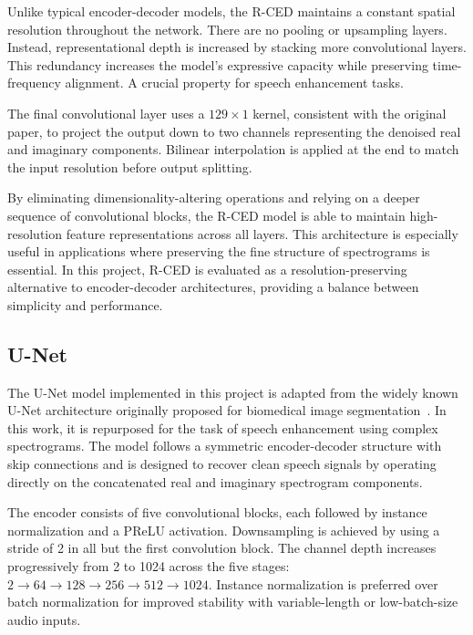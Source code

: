Unlike typical encoder-decoder models, the R-CED maintains a constant spatial resolution throughout the network. There are no pooling or upsampling layers. Instead, representational depth is increased by stacking more convolutional layers. This redundancy increases the model’s expressive capacity while preserving time-frequency alignment. A crucial property for speech enhancement tasks.

The final convolutional layer uses a \(129 \times 1\) kernel, consistent with the original paper, to project the output down to two channels representing the denoised real and imaginary components. Bilinear interpolation is applied at the end to match the input resolution before output splitting.

By eliminating dimensionality-altering operations and relying on a deeper sequence of convolutional blocks, the R-CED model is able to maintain high-resolution feature representations across all layers. This architecture is especially useful in applications where preserving the fine structure of spectrograms is essential. In this project, R-CED is evaluated as a resolution-preserving alternative to encoder-decoder architectures, providing a balance between simplicity and performance.

\subsection{U-Net}
\label{sec:unet}

The U-Net model implemented in this project is adapted from the widely known U-Net architecture originally proposed for biomedical image segmentation~\cite{ronneberger2015unet}. In this work, it is repurposed for the task of speech enhancement using complex spectrograms. The model follows a symmetric encoder-decoder structure with skip connections and is designed to recover clean speech signals by operating directly on the concatenated real and imaginary spectrogram components.

The encoder consists of five convolutional blocks, each followed by instance normalization and a PReLU activation. Downsampling is achieved by using a stride of 2 in all but the first convolution block. The channel depth increases progressively from 2 to 1024 across the five stages: \(2 \rightarrow 64 \rightarrow 128 \rightarrow 256 \rightarrow 512 \rightarrow 1024\). Instance normalization is preferred over batch normalization for improved stability with variable-length or low-batch-size audio inputs.

